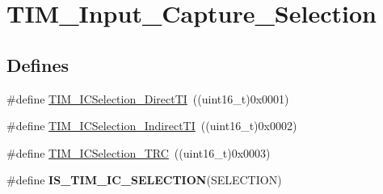 \hypertarget{group__TIM__Input__Capture__Selection}{
\section{TIM\_\-Input\_\-Capture\_\-Selection}
\label{group__TIM__Input__Capture__Selection}
}
\subsection*{Defines}
\begin{DoxyCompactItemize}
\item 
\#define \hyperlink{group__TIM__Input__Capture__Selection_ga3d38876044457b7faefe951d367ac8c3}{TIM\_\-ICSelection\_\-DirectTI}~((uint16\_\-t)0x0001)
\item 
\#define \hyperlink{group__TIM__Input__Capture__Selection_ga2289b684133ac0b81ddfcd860d01b144}{TIM\_\-ICSelection\_\-IndirectTI}~((uint16\_\-t)0x0002)
\item 
\#define \hyperlink{group__TIM__Input__Capture__Selection_ga2cd464e97ffd6ea3208ec65672f9a373}{TIM\_\-ICSelection\_\-TRC}~((uint16\_\-t)0x0003)
\item 
\#define {\bfseries IS\_\-TIM\_\-IC\_\-SELECTION}(SELECTION)
\end{DoxyCompactItemize}


